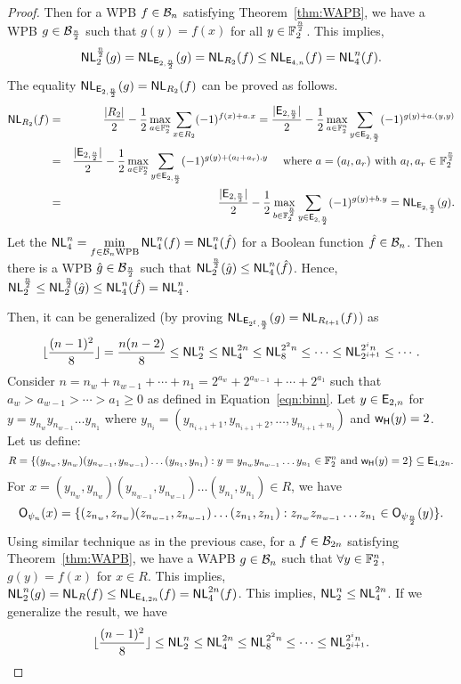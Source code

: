 \documentclass{llncs}
\begin{document}
\begin{proof}
Then for a WPB $f \in \mathcal{B}_n$ satisfying Theorem~\ref{thm:WAPB}, we have a WPB $g \in \mathcal{B}_{\frac{n}{2}}$  such that $g(y) = f(x)$ for all $y \in \mathbb{F}_2^{\frac{n}{2}}$. 
This implies, 
\begin{equation}\label{eqn:NL}
\mathsf{NL}_{2}^{\frac{n}{2}}(g) = \mathsf{NL}_{\mathsf{E}_{2,\frac{n}{2}}}(g) = \mathsf{NL}_{R_2}(f) \leq \mathsf{NL}_{\mathsf{E}_{4,n}}(f) = \mathsf{NL}_{4}^{n}(f).
\end{equation}
The equality $\mathsf{NL}_{\mathsf{E}_{2,\frac{n}{2}}}(g) = \mathsf{NL}_{R_2}(f)$ can be proved as follows.
\begin{eqnarray*}
\mathsf{NL}_{R_2}(f) & = & \frac{|R_2|}{2} - \frac{1}{2}\max\limits_{a \in \mathbb{F}_2^n}{\sum\limits_{x\in R_2} (-1)^{f(x)+a.x}} 
= \frac{|\mathsf{E}_{2,\frac{n}{2}}|}{2} - \frac{1}{2}\max\limits_{a \in \mathbb{F}_2^n}{\sum\limits_{y \in \mathsf{E}_{2,\frac{n}{2}}} (-1)^{g(y)+a.(y,y)}} \\
& = & \frac{|\mathsf{E}_{2,\frac{n}{2}}|}{2} - \frac{1}{2}\max\limits_{a \in \mathbb{F}_2^n}{\sum\limits_{y \in \mathsf{E}_{2,\frac{n}{2}}} (-1)^{g(y)+(a_l+a_r).y}} ~~~\text{ where } a = (a_l,a_r)\text{ with } a_l,a_r \in \mathbb{F}_2^{\frac{n}{2}}\\
& = & \frac{|\mathsf{E}_{2,\frac{n}{2}}|}{2} - \frac{1}{2}\max\limits_{b \in \mathbb{F}_2^{\frac{n}{2}}}{\sum\limits_{y \in \mathsf{E}_{2,\frac{n}{2}}} (-1)^{g(y)+b.y}} = \mathsf{NL}_{\mathsf{E}_{2,\frac{n}{2}}}(g).
\end{eqnarray*}
Let the $\mathsf{NL}_{4}^{n} = \min\limits_{f\in \mathcal{B}_n \text{WPB}} \mathsf{NL}_{4}^{n}(f) = \mathsf{NL}_{4}^{n}(\hat{f})$ for a Boolean function $\hat{f} \in \mathcal{B}_n$. Then there is a WPB $\hat{g} \in \mathcal{B}_{\frac{n}{2}}$ such that $\mathsf{NL}_{2}^{\frac{n}{2}}(\hat{g}) \leq \mathsf{NL}_{4}^{n}(\hat{f})$. Hence, $\mathsf{NL}_{2}^{\frac{n}{2}} \leq \mathsf{NL}_{2}^{\frac{n}{2}}(\hat{g}) \leq \mathsf{NL}_{4}^{n}(\hat{f}) = \mathsf{NL}_{4}^{n}$.

Then, it can be generalized (by proving $\mathsf{NL}_{\mathsf{E}_{2^t,\frac{n}{2}}}(g) = \mathsf{NL}_{R_{t+1}}(f)$) as
$$\lfloor\frac{(n-1)^2}{8}\rfloor = \frac{n(n-2)}{8} \leq \mathsf{NL}_{2}^n \leq \mathsf{NL}_{4}^{2n} \leq \mathsf{NL}_{8}^{2^{2}n } \leq \cdots \leq \mathsf{NL}_{2^{i+1}}^{2^{i}n} \leq \cdots.$$ 
Consider $n = n_w + n _{w-1} + \cdots + n_1 = 2^{a_w} + 2^{a_{w-1}} + \cdots + 2^{a_1}$ such that $ a_w > a_{w-1} > \cdots > a_1 \geq 0$ as defined in Equation~\ref{eqn:binn}. Let $y \in \mathsf{E}_{2,n}$ for  $y = y_{n_w} y_{n_{w-1}} \ldots y_{n_1}$ where $y_{n_i} = (y_{n_{i+1}+1},y_{n_{i+1}+2},\ldots , y_{n_{i+1}+n_i})$ and $\mathsf{w_H}(y)=2$. 
Let us define:
$$R =\{(y_{n_w},y_{n_w})(y_{n_{w-1}},y_{n_{w-1}})\ldots (y_{n_1},y_{n_1}) : y = y_{n_w} y_{n_{w-1}} \ldots y_{n_1} \in \mathbb{F}_2^{n} \text{ and } \mathsf{w_H}(y) = 2 \} \subseteq \mathsf{E}_{4,2n}.$$ 
For $x =  (y_{n_w},y_{n_w})(y_{n_{w-1}},y_{n_{w-1}})\ldots (y_{n_1},y_{n_1}) \in R $, we have
$$\mathsf{O}_{\psi_n}(x) = \{(z_{n_w}, z_{n_w})(z_{n_{w-1}},z_{n_{w-1}})\ldots (z_{n_1},z_{n_1}) : z_{n_w} z_{n_{w-1}} \ldots z_{n_1} \in \mathsf{O}_{\psi_\frac{n}{2}}(y)\}.$$
Using similar technique as in the previous case, for a $ f \in \mathcal{B}_{2n}$ satisfying Theorem~\ref{thm:WAPB}, we have a WAPB $g \in \mathcal{B}_{n}$  such that $\forall y \in \mathbb{F}_2^{n}$,  $g(y) = f(x)$ for $ x \in R$. This implies, $\mathsf{NL}_{2}^{n}(g) = \mathsf{NL}_{R}(f) \leq \mathsf{NL}_{\mathsf{E}_{4,2n}}(f) = \mathsf{NL}_{4}^{2n}(f)$. This implies, $\mathsf{NL}_{2}^{n} \leq \mathsf{NL}_{4}^{2n}$.
If we generalize the result, we have
$$ \lfloor\frac{(n-1)^2}{8}\rfloor \leq \mathsf{NL}_{2}^n \leq \mathsf{NL}_{4}^{2n} \leq \mathsf{NL}_{8}^{2^{2}n } \leq \cdots \leq \mathsf{NL}_{2^{i+1}}^{2^{i}n}.$$\fi
\end{proof}
\end{document}
